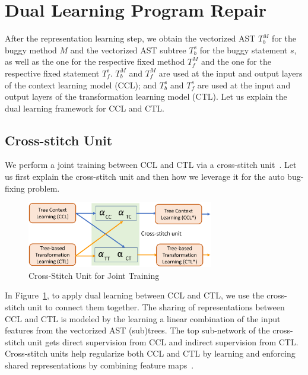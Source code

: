 \section{Dual Learning Program Repair}
\label{sec: dual-learning}

After the representation learning step, we obtain the vectorized AST
$T^{M}_b$ for the buggy method $M$ and the vectorized AST subtree
$T^{s}_b$ for the buggy statement $s$, as well as the one for the
respective fixed method $T^{M}_f$ and the one for the respective fixed
statement $T^{s}_f$. $T^{M}_b$ and $T^{M}_f$ are used at the input and
output layers of the context learning model (CCL); and
$T^{s}_b$ and $T^{s}_f$ are used at the input and output layers of the
transformation learning model (CTL). Let us explain the dual
learning framework for CCL and CTL.



\subsection{Cross-stitch Unit}

We perform a joint training between CCL and CTL via
a cross-stitch unit~\cite{misra2016cross}. Let us first explain the
cross-stitch unit and then how we leverage it for the auto bug-fixing
problem.

\begin{figure}[t]
	\centering
	\includegraphics[width=3.2in]{graphs/cross-stitch}
	\caption{Cross-Stitch Unit for Joint Training~\cite{misra2016cross}}
	\label{fig:cross-stitch}
\end{figure}

In Figure~\ref{fig:cross-stitch}, to apply dual learning between
CCL and CTL, we use the cross-stitch unit to connect
them together. The sharing of representations between CCL and
CTL is modeled by the learning a linear combination of the
input features from the vectorized AST (sub)trees. The top sub-network
of the cross-stitch unit gets direct supervision from CCL and
indirect supervision from CTL. Cross-stitch units help
regularize both CCL and CTL by learning and enforcing
shared representations by combining feature
maps~\cite{misra2016cross}.

